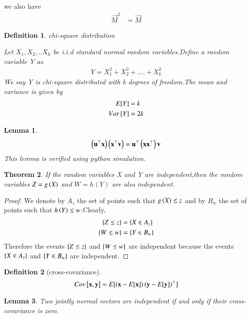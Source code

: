 \documentclass[journal,12pt,twocolumn]{IEEEtran}
\newtheorem{theorem}{Theorem}[section]
\newtheorem{lemma}[theorem]{Lemma}
\newtheorem{definition}{Definition}[section]
\begin{document}
we also have 
\begin{align}
    \vec{M}^2&=\vec{M}
\end{align}
\begin{definition}{chi-square distribution}

 Let $X_1,X_2,..X_k$ be i.i.d  standard normal random variables.Define a random variable Y as
 \begin{align}
     Y=X_1^2+X_2^2+....+X_k^2
 \end{align}
 We say Y is chi-square distributed with k degrees of freedom.The mean and variance is given by
 \begin{align}
   E[ Y ]&=k\\
   Var{}\left[Y\right]&=2k
 \end{align}
 
\end{definition}
\begin{lemma}
\label{l2.1}
\begin{align}
   \left(\mathbf{u}^{\top}\mathbf{x}\right)\left(\mathbf{x}^{\top}\mathbf{v}\right)=\mathbf{u}^{\top}\left(\mathbf{x}\mathbf{x}^{\top}\right)\mathbf{v}
\end{align}
This lemma is verified using python simulation.
\end{lemma}
\begin{theorem}
\label{shit}
If the random variables X and Y are independent,then the random variables $Z=g\left(X\right)$ and $W=h(Y)$ are also independent.
\end{theorem}
\begin{proof}
We denote by $A_z$ the set of points such that $g\left(X\right)\leq \textit{z}$ and by  $B_w$ the set of points such that $h\left(Y\right)\leq \textit{w}$.Clearly,
\begin{align}
    \left\{Z\leq \textit{z}\right\}&=\left\{X\in A_z\right\}\\
    \left\{W\leq \textit{w}\right\}&=\left\{Y\in B_w\right\}
\end{align}
Therefore the events $\left\{Z\leq \textit{z}\right\}$ and $\left\{W\leq \textit{w}\right\}$ are independent because the events $\left\{X\in A_z\right\}$ and $\left\{Y\in B_w\right\}$ are independent.
\end{proof}
\begin{definition}[cross-covariance]
\begin{align}
    Cov{}\left[\mathbf{x},\mathbf{y}\right]=E[ \left(\mathbf{x}-E[ \mathbf{x} ]\right)\left(\mathbf{y}-E[ \mathbf{y} ]\right)^{\top} ]
\end{align}
\end{definition}
\begin{lemma}
Two jointly normal vectors are independent if and only if their cross-covariance is zero.
\end{lemma}
\end{document}
